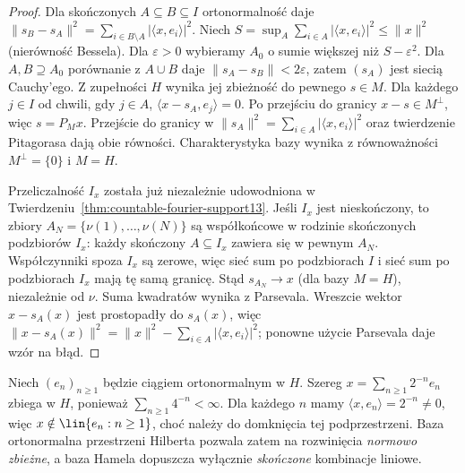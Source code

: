 \begin{proof}
Dla skończonych $A\subseteq B\subseteq I$ ortonormalność daje
$\|s_B-s_A\|^2=\sum_{i\in B\setminus A}|\langle x,e_i\rangle|^2$.
Niech $S=\sup_A\sum_{i\in A}|\langle x,e_i\rangle|^2
\le\|x\|^2$ (nierówność Bessela). Dla $\varepsilon>0$ wybieramy
$A_0$ o sumie większej niż $S-\varepsilon^2$.
Dla $A,B\supseteq A_0$ porównanie z $A\cup B$ daje
$\|s_A-s_B\|<2\varepsilon$, zatem $(s_A)$ jest siecią
Cauchy'ego. Z zupełności $H$ wynika jej zbieżność do pewnego
$s\in M$. Dla każdego $j\in I$ od chwili, gdy $j\in A$,
$\langle x-s_A,e_j\rangle=0$. Po przejściu do granicy
$x-s\in M^\perp$, więc $s=P_Mx$. Przejście do granicy
w $\|s_A\|^2=\sum_{i\in A}|\langle x,e_i\rangle|^2$
oraz twierdzenie Pitagorasa dają obie równości.
Charakterystyka bazy wynika z równoważności $M^\perp=\{0\}$
i $M=H$.

Przeliczalność $I_x$ została już niezależnie udowodniona
w Twierdzeniu~\ref{thm:countable-fourier-support13}.
Jeśli $I_x$ jest nieskończony, to zbiory
$A_N=\{\nu(1),\ldots,\nu(N)\}$ są współkońcowe w rodzinie
skończonych podzbiorów $I_x$: każdy skończony
$A\subseteq I_x$ zawiera się w pewnym $A_N$. Współczynniki
spoza $I_x$ są zerowe, więc sieć sum po podzbiorach $I$ i
sieć sum po podzbiorach $I_x$ mają tę samą granicę.
Stąd $s_{A_N}\to x$ (dla bazy $M=H$), niezależnie od $\nu$.
Suma kwadratów wynika z Parsevala. Wreszcie wektor
$x-s_A(x)$ jest prostopadły do $s_A(x)$, więc
$\|x-s_A(x)\|^2=\|x\|^2-\sum_{i\in A}|\langle x,e_i\rangle|^2$;
ponowne użycie Parsevala daje wzór na błąd.
\end{proof}

\begin{przyklad}
\label{ex:hilbert-series-not-hamel13}
Niech $(e_n)_{n\ge1}$ będzie ciągiem ortonormalnym w $H$.
Szereg $x=\sum_{n\ge1}2^{-n}e_n$ zbiega w $H$, ponieważ
$\sum_{n\ge1}4^{-n}<\infty$. Dla każdego $n$ mamy
$\langle x,e_n\rangle=2^{-n}\ne0$, więc
$x\notin\lin\{e_n:n\ge1\}$, choć należy do domknięcia
tej podprzestrzeni. Baza ortonormalna przestrzeni Hilberta pozwala zatem na rozwinięcia
\emph{normowo zbieżne}, a baza Hamela dopuszcza wyłącznie
\emph{skończone} kombinacje liniowe.
\end{przyklad}

